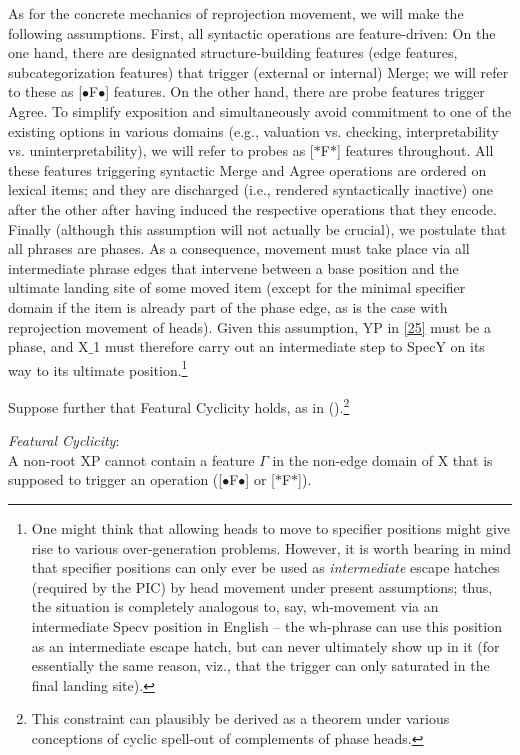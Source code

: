 \documentclass[output=paper
,modfonts
,nonflat]{langsci/langscibook}
\begin{document}
As for the concrete mechanics of reprojection movement, we will make
the following assumptions. First,  all syntactic operations are
feature-driven: On the one hand, there are designated   structure-building features (edge features, subcategorization
features) that trigger (external or internal) Merge; we will refer to
these as [{\small $\bullet$}F{\small $\bullet$}] features. On the
other hand, there are   probe features trigger Agree. To simplify
exposition and simultaneously avoid commitment to one of the existing options in
various domains (e.g., valuation vs. checking, interpretability
vs. uninterpretability), we will refer to probes as 
 [$*$F$*$] features throughout.
All these features triggering syntactic Merge and Agree operations are
ordered on lexical items; and they are discharged (i.e., rendered
syntactically inactive) one after the other
after having induced the respective operations that they encode. 
Finally (although this assumption will not actually be crucial), we
postulate that all phrases are phases. As a consequence, movement must take place via all
  intermediate phrase edges  that intervene between a base position and
  the ultimate landing site of some moved item (except for the minimal
  specifier domain if the item is already part of the phase edge, as
  is the case with reprojection movement of heads). Given this
  assumption, YP in \ref{25} must be a phase, and X$\_$1 must therefore
  carry out an intermediate step to SpecY on its way to its ultimate
  position.\footnote{One might think that allowing heads to move to
    specifier positions might give rise to various over-generation
    problems. However, it is worth bearing in mind that specifier
    positions can only ever be used as {\itshape intermediate} escape
    hatches (required by the PIC) by head movement under present
    assumptions; thus, the situation is completely analogous to, say,
    wh-movement via an intermediate Specv position in English -- the
    wh-phrase can use this position as an intermediate escape hatch,
    but can never ultimately show up in it (for essentially the same
    reason, viz., that the trigger can only saturated in the final
    landing site).}

Suppose further that Featural Cyclicity holds, as in
(\Next).\footnote{This constraint can plausibly be derived as a theorem
  under various conceptions of cyclic spell-out of complements of
  phase heads.}

\ea\label{ex:mueller:27} {\itshape Featural \label{fc}Cyclicity}:\\
A non-root XP cannot contain a feature $\Gamma$ in the non-edge domain of X that is supposed to trigger an operation ([{\small $\bullet$}F{\small $\bullet$}] or [$*$F$*$]).\z
\end{document}
